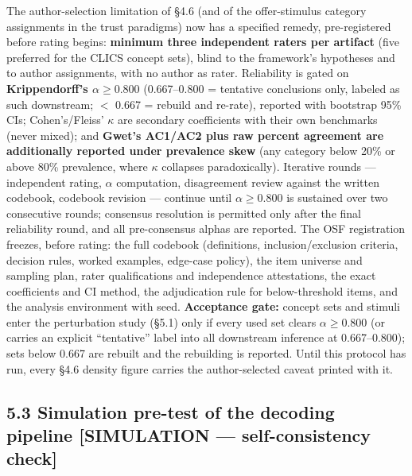 \documentclass[
]{article}
\begin{document}
The author-selection limitation of §4.6 (and of the offer-stimulus
category assignments in the trust paradigms) now has a specified remedy,
pre-registered before rating begins: \textbf{minimum three independent
raters per artifact} (five preferred for the CLICS concept sets), blind
to the framework's hypotheses and to author assignments, with no author
as rater. Reliability is gated on \textbf{Krippendorff's
\(\alpha \geq 0.800\)} (0.667--0.800 = tentative conclusions only,
labeled as such downstream; \(<\) 0.667 = rebuild and re-rate), reported
with bootstrap 95\% CIs; Cohen's/Fleiss' \(\kappa\) are secondary
coefficients with their own benchmarks (never mixed); and \textbf{Gwet's
AC1/AC2 plus raw percent agreement are additionally reported under
prevalence skew} (any category below 20\% or above 80\% prevalence,
where \(\kappa\) collapses paradoxically). Iterative rounds ---
independent rating, \(\alpha\) computation, disagreement review against
the written codebook, codebook revision --- continue until
\(\alpha \geq 0.800\) is sustained over two consecutive rounds;
consensus resolution is permitted only after the final reliability
round, and all pre-consensus alphas are reported. The OSF registration
freezes, before rating: the full codebook (definitions,
inclusion/exclusion criteria, decision rules, worked examples, edge-case
policy), the item universe and sampling plan, rater qualifications and
independence attestations, the exact coefficients and CI method, the
adjudication rule for below-threshold items, and the analysis
environment with seed. \textbf{Acceptance gate:} concept sets and
stimuli enter the perturbation study (§5.1) only if every used set
clears \(\alpha \geq 0.800\) (or carries an explicit ``tentative'' label
into all downstream inference at 0.667--0.800); sets below 0.667 are
rebuilt and the rebuilding is reported. Until this protocol has run,
every §4.6 density figure carries the author-selected caveat printed
with it.

\subsection{5.3 Simulation pre-test of the decoding pipeline
{[}SIMULATION --- self-consistency
check{]}}\label{simulation-pre-test-of-the-decoding-pipeline-simulation-self-consistency-check}
\end{document}
